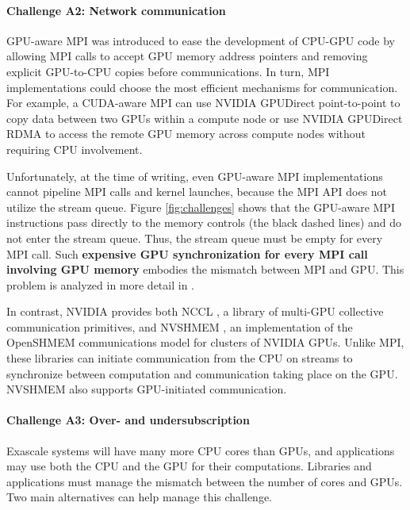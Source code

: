 \documentclass[10pt,journal,compsoc]{IEEEtran}
\begin{document}
\paragraph{Challenge A2: Network communication}



GPU-aware MPI was introduced to ease the development of CPU-GPU code by allowing MPI calls to
accept GPU memory address pointers and removing explicit GPU-to-CPU copies before communications. In turn, MPI implementations could choose the most efficient mechanisms for communication. 
For example, a CUDA-aware MPI can use NVIDIA GPUDirect point-to-point to copy
data between two GPUs within a compute node or use NVIDIA GPUDirect RDMA to
access the remote GPU memory across compute nodes without requiring CPU
involvement. 

Unfortunately, at the time of writing, even GPU-aware MPI implementations cannot pipeline MPI calls and kernel launches, because the MPI API does not utilize the stream queue. Figure \ref{fig:challenges} shows that the GPU-aware MPI instructions pass directly to the memory controls (the black dashed lines)
and do not enter the stream queue. Thus, the stream queue must be empty for every MPI call. Such {\bf expensive GPU synchronization for every  MPI call
involving GPU memory} embodies the mismatch between MPI and GPU. This problem is analyzed in more detail in \cite{SNIR}.



In contrast, NVIDIA provides both NCCL \cite{NCCL}, a library of multi-GPU collective communication primitives, and
NVSHMEM \cite{NVSHMEM}, an implementation of the OpenSHMEM \cite{OpenSHMEM} communications model for clusters
of NVIDIA GPUs. Unlike MPI, these libraries can initiate communication
from the CPU on streams to synchronize between computation and
communication taking place on the GPU. NVSHMEM also supports
GPU-initiated communication.



\paragraph{Challenge A3: Over- and undersubscription}

Exascale systems will have many more CPU cores than GPUs,
and applications may use both the CPU and the GPU for their computations.
Libraries and applications must manage the mismatch between the
number of cores and GPUs.  Two main alternatives can help
manage this challenge.
\end{document}
